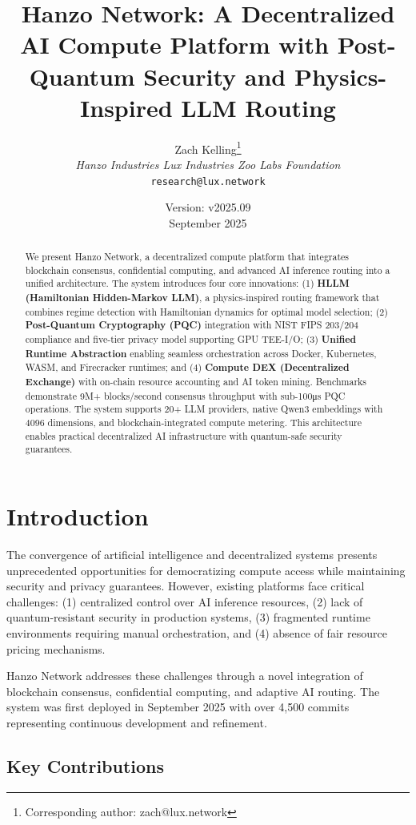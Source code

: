 \documentclass[11pt,twocolumn]{article}
\title{\textbf{Hanzo Network: A Decentralized AI Compute Platform with Post-Quantum Security and Physics-Inspired LLM Routing}}
\author{
Zach Kelling\thanks{Corresponding author: zach@lux.network} \\
\textit{Hanzo Industries \quad Lux Industries \quad Zoo Labs Foundation} \\
\texttt{research@lux.network}
}
\date{Version: v2025.09 \\ September 2025}
\begin{document}
\luxcoverpage
\maketitle

\begin{abstract}
We present Hanzo Network, a decentralized compute platform that integrates blockchain consensus, confidential computing, and advanced AI inference routing into a unified architecture. The system introduces four core innovations: (1) \textbf{HLLM (Hamiltonian Hidden-Markov LLM)}, a physics-inspired routing framework that combines regime detection with Hamiltonian dynamics for optimal model selection; (2) \textbf{Post-Quantum Cryptography (PQC)} integration with NIST FIPS 203/204 compliance and five-tier privacy model supporting GPU TEE-I/O; (3) \textbf{Unified Runtime Abstraction} enabling seamless orchestration across Docker, Kubernetes, WASM, and Firecracker runtimes; and (4) \textbf{Compute DEX (Decentralized Exchange)} with on-chain resource accounting and AI token mining. Benchmarks demonstrate 9M+ blocks/second consensus throughput with sub-100μs PQC operations. The system supports 20+ LLM providers, native Qwen3 embeddings with 4096 dimensions, and blockchain-integrated compute metering. This architecture enables practical decentralized AI infrastructure with quantum-safe security guarantees.
\end{abstract}

\section{Introduction}

The convergence of artificial intelligence and decentralized systems presents unprecedented opportunities for democratizing compute access while maintaining security and privacy guarantees. However, existing platforms face critical challenges: (1) centralized control over AI inference resources, (2) lack of quantum-resistant security in production systems, (3) fragmented runtime environments requiring manual orchestration, and (4) absence of fair resource pricing mechanisms.

Hanzo Network addresses these challenges through a novel integration of blockchain consensus, confidential computing, and adaptive AI routing. The system was first deployed in September 2025 with over 4,500 commits representing continuous development and refinement.

\subsection{Key Contributions}
\end{document}
